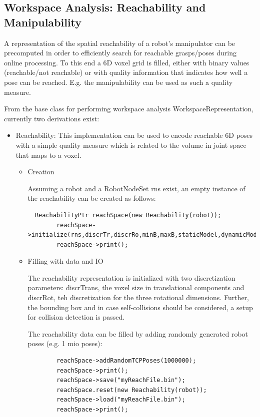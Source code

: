 \documentclass{book}
\begin{document}
\subsection{Workspace Analysis: Reachability and Manipulability}
 A representation of the spatial reachability of a robot's manipulator can be precomputed in order to efficiently search for reachable grasps/poses during online processing. To this end a 6D voxel grid is filled, either with binary values (reachable/not reachable) or with quality information that indicates how well a pose can be reached. E.g. the manipulability can be used as such a quality measure.
\par
From the base class for performing workspace analysis WorkspaceRepresentation, currently two derivations exist: 
\begin{itemize}
\item Reachability: This implementation can be used to encode reachable 6D poses with a simple quality measure which is related to the volume in joint space that maps to a voxel.
\begin{itemize}
\item Creation \par
Assuming a robot and a RobotNodeSet rns exist, an empty instance of the reachability can be created as follows:
\begin{lstlisting}
  ReachabilityPtr reachSpace(new Reachability(robot));
        reachSpace->initialize(rns,discrTr,discrRo,minB,maxB,staticModel,dynamicModel,baseNode,tcpNode);
        reachSpace->print();
\end{lstlisting}
\item Filling with data and IO  \par
 The reachability representation is initialized with two discretization parameters: discrTrans, the voxel size in translational components and discrRot, teh discretization for the three rotational dimensions. Further, the bounding box and in case self-collisions should be considered, a setup for collision detection is passed.\par
 The reachability data can be filled by adding randomly generated robot poses (e.g. 1 mio poses): 
 \begin{lstlisting}
        reachSpace->addRandomTCPPoses(1000000);
        reachSpace->print();
        reachSpace->save("myReachFile.bin");
        reachSpace.reset(new Reachability(robot));
        reachSpace->load("myReachFile.bin");
        reachSpace->print();
 \end{lstlisting}
  \par

\end{itemize}
\end{itemize}
\end{document}
